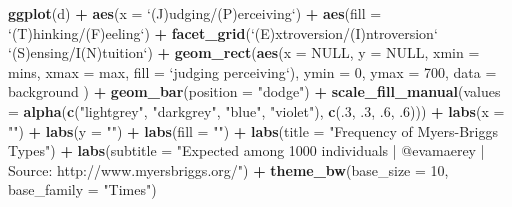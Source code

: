 \documentclass[]{book}
\newenvironment{Shaded}{\begin{snugshade}}{\end{snugshade}}
\newcommand{\KeywordTok}[1]{\textcolor[rgb]{0.13,0.29,0.53}{\textbf{#1}}}
\newcommand{\DataTypeTok}[1]{\textcolor[rgb]{0.13,0.29,0.53}{#1}}
\newcommand{\DecValTok}[1]{\textcolor[rgb]{0.00,0.00,0.81}{#1}}
\newcommand{\StringTok}[1]{\textcolor[rgb]{0.31,0.60,0.02}{#1}}
\newcommand{\OtherTok}[1]{\textcolor[rgb]{0.56,0.35,0.01}{#1}}
\newcommand{\OperatorTok}[1]{\textcolor[rgb]{0.81,0.36,0.00}{\textbf{#1}}}
\newcommand{\NormalTok}[1]{#1}
\theoremstyle{definition}
\theoremstyle{definition}
\theoremstyle{definition}
\theoremstyle{remark}
\begin{document}
\begin{Shaded}
\begin{Highlighting}[]
\KeywordTok{ggplot}\NormalTok{(d) }\OperatorTok{+}
\StringTok{  }\KeywordTok{aes}\NormalTok{(}\DataTypeTok{x =} \StringTok{`}\DataTypeTok{(J)udging/(P)erceiving}\StringTok{`}\NormalTok{) }\OperatorTok{+}
\StringTok{  }\KeywordTok{aes}\NormalTok{(}\DataTypeTok{fill =} \StringTok{`}\DataTypeTok{(T)hinking/(F)eeling}\StringTok{`}\NormalTok{) }\OperatorTok{+}
\StringTok{  }\KeywordTok{facet_grid}\NormalTok{(}\StringTok{`}\DataTypeTok{(E)xtroversion/(I)ntroversion}\StringTok{`} \OperatorTok{~}
\StringTok{               `}\DataTypeTok{(S)ensing/I(N)tuition}\StringTok{`}\NormalTok{) }\OperatorTok{+}
\StringTok{  }\KeywordTok{geom_rect}\NormalTok{(}\KeywordTok{aes}\NormalTok{(}\DataTypeTok{x =} \OtherTok{NULL}\NormalTok{, }\DataTypeTok{y =} \OtherTok{NULL}\NormalTok{,}
                \DataTypeTok{xmin =}\NormalTok{ mins, }\DataTypeTok{xmax =}\NormalTok{ max, }
                \DataTypeTok{fill =} \StringTok{`}\DataTypeTok{judging perceiving}\StringTok{`}\NormalTok{),}
                \DataTypeTok{ymin =} \DecValTok{0}\NormalTok{, }\DataTypeTok{ymax =} \DecValTok{700}\NormalTok{, }\DataTypeTok{data =}\NormalTok{ background}
\NormalTok{  ) }\OperatorTok{+}
\StringTok{  }\KeywordTok{geom_bar}\NormalTok{(}\DataTypeTok{position =} \StringTok{"dodge"}\NormalTok{) }\OperatorTok{+}
\StringTok{  }\KeywordTok{scale_fill_manual}\NormalTok{(}\DataTypeTok{values =} \KeywordTok{alpha}\NormalTok{(}\KeywordTok{c}\NormalTok{(}\StringTok{"lightgrey"}\NormalTok{, }\StringTok{"darkgrey"}\NormalTok{, }\StringTok{"blue"}\NormalTok{, }\StringTok{"violet"}\NormalTok{), }\KeywordTok{c}\NormalTok{(.}\DecValTok{3}\NormalTok{, .}\DecValTok{3}\NormalTok{, .}\DecValTok{6}\NormalTok{, .}\DecValTok{6}\NormalTok{))) }\OperatorTok{+}
\StringTok{  }\KeywordTok{labs}\NormalTok{(}\DataTypeTok{x =} \StringTok{""}\NormalTok{) }\OperatorTok{+}\StringTok{ }
\StringTok{  }\KeywordTok{labs}\NormalTok{(}\DataTypeTok{y =} \StringTok{""}\NormalTok{) }\OperatorTok{+}\StringTok{ }
\StringTok{  }\KeywordTok{labs}\NormalTok{(}\DataTypeTok{fill =} \StringTok{""}\NormalTok{) }\OperatorTok{+}
\StringTok{  }\KeywordTok{labs}\NormalTok{(}\DataTypeTok{title =} \StringTok{"Frequency of Myers-Briggs Types"}\NormalTok{) }\OperatorTok{+}
\StringTok{  }\KeywordTok{labs}\NormalTok{(}\DataTypeTok{subtitle =} \StringTok{"Expected among 1000 individuals | @evamaerey | Source: http://www.myersbriggs.org/"}\NormalTok{) }\OperatorTok{+}\StringTok{ }
\StringTok{  }\KeywordTok{theme_bw}\NormalTok{(}\DataTypeTok{base_size =} \DecValTok{10}\NormalTok{, }\DataTypeTok{base_family =} \StringTok{"Times"}\NormalTok{) }
\end{Highlighting}
\end{Shaded}
\end{document}
